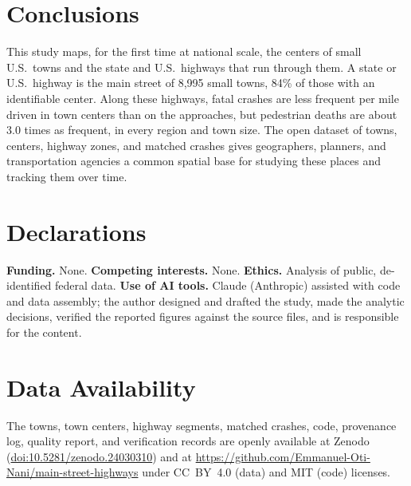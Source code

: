 \documentclass[11pt,letterpaper]{article}
\newcommand{\doi}[1]{\href{https://doi.org/#1}{doi:#1}}
\begin{document}
\section{Conclusions}
This study maps, for the first time at national scale, the centers of small U.S.\ towns and the state and U.S.\ highways that run through them. A state or U.S.\ highway is the main street of 8{,}995 small towns, 84\% of those with an identifiable center. Along these highways, fatal crashes are less frequent per mile driven in town centers than on the approaches, but pedestrian deaths are about 3.0 times as frequent, in every region and town size. The open dataset of towns, centers, highway zones, and matched crashes gives geographers, planners, and transportation agencies a common spatial base for studying these places and tracking them over time.

\section*{Declarations}
\textbf{Funding.} None. \textbf{Competing interests.} None. \textbf{Ethics.} Analysis of public, de-identified federal data. \textbf{Use of AI tools.} Claude (Anthropic) assisted with code and data assembly; the author designed and drafted the study, made the analytic decisions, verified the reported figures against the source files, and is responsible for the content.

\section*{Data Availability}
The towns, town centers, highway segments, matched crashes, code, provenance log, quality report, and verification records are openly available at Zenodo~\cite{dataset} (\doi{10.5281/zenodo.24030310}) and at \url{https://github.com/Emmanuel-Oti-Nani/main-street-highways} under CC~BY~4.0 (data) and MIT (code) licenses.
\end{document}
